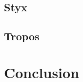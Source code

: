 \documentclass{article}
\begin{document}
\cite{conf/aose/Omicini00}

\subsection{Styx}

\cite{bush2001styx}

\subsection{Tropos}

\cite{journals/informaticaSI/SusiPMG05}

\section{Conclusion}



\end{document}
